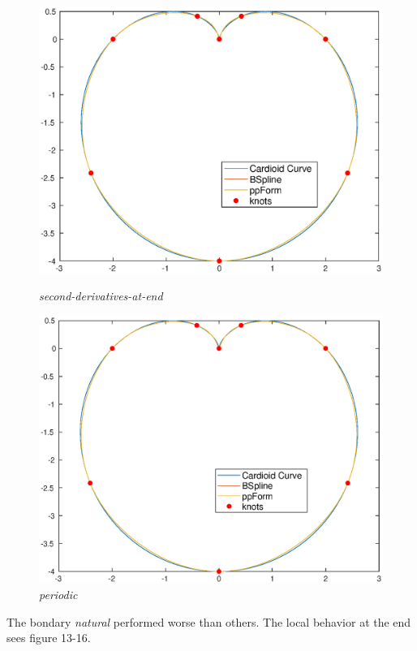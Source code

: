 \documentclass[11pt,en]{elegantpaper}
\begin{document}
\begin{figure}[htbp]
\begin{minipage}[t]{0.4\linewidth}
        \includegraphics[width=0.9\linewidth]{figure/curve_cardioid_second-derivatives-at-end.eps}
        \caption{\textit{second-derivatives-at-end}}
        \label{fig:side:c}
    \end{minipage}%
    \begin{minipage}[t]{0.4\linewidth}
        \centering
        \includegraphics[width=0.9\linewidth]{figure/curve_cardioid_periodic.eps}
        \caption{\textit{periodic}}
        \label{fig:side:c}
    \end{minipage}%
\end{figure}

The bondary \textit{natural} performed worse than others. The local behavior at the end sees figure 13-16.
\end{document}
